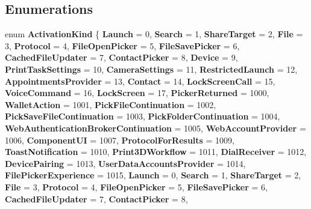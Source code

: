 \subsection*{Enumerations}
\begin{DoxyCompactItemize}
\item 
\mbox{\label{namespace_windows_1_1_application_model_1_1_activation_a21aa80ed65cf8b4f5d0d6c3b39f65284}} 
enum {\bfseries Activation\+Kind} \{ \newline
{\bfseries Launch} = 0, 
{\bfseries Search} = 1, 
{\bfseries Share\+Target} = 2, 
{\bfseries File} = 3, 
\newline
{\bfseries Protocol} = 4, 
{\bfseries File\+Open\+Picker} = 5, 
{\bfseries File\+Save\+Picker} = 6, 
{\bfseries Cached\+File\+Updater} = 7, 
\newline
{\bfseries Contact\+Picker} = 8, 
{\bfseries Device} = 9, 
{\bfseries Print\+Task\+Settings} = 10, 
{\bfseries Camera\+Settings} = 11, 
\newline
{\bfseries Restricted\+Launch} = 12, 
{\bfseries Appointments\+Provider} = 13, 
{\bfseries Contact} = 14, 
{\bfseries Lock\+Screen\+Call} = 15, 
\newline
{\bfseries Voice\+Command} = 16, 
{\bfseries Lock\+Screen} = 17, 
{\bfseries Picker\+Returned} = 1000, 
{\bfseries Wallet\+Action} = 1001, 
\newline
{\bfseries Pick\+File\+Continuation} = 1002, 
{\bfseries Pick\+Save\+File\+Continuation} = 1003, 
{\bfseries Pick\+Folder\+Continuation} = 1004, 
{\bfseries Web\+Authentication\+Broker\+Continuation} = 1005, 
\newline
{\bfseries Web\+Account\+Provider} = 1006, 
{\bfseries Component\+UI} = 1007, 
{\bfseries Protocol\+For\+Results} = 1009, 
{\bfseries Toast\+Notification} = 1010, 
\newline
{\bfseries Print3\+D\+Workflow} = 1011, 
{\bfseries Dial\+Receiver} = 1012, 
{\bfseries Device\+Pairing} = 1013, 
{\bfseries User\+Data\+Accounts\+Provider} = 1014, 
\newline
{\bfseries File\+Picker\+Experience} = 1015, 
{\bfseries Launch} = 0, 
{\bfseries Search} = 1, 
{\bfseries Share\+Target} = 2, 
\newline
{\bfseries File} = 3, 
{\bfseries Protocol} = 4, 
{\bfseries File\+Open\+Picker} = 5, 
{\bfseries File\+Save\+Picker} = 6, 
\newline
{\bfseries Cached\+File\+Updater} = 7, 
{\bfseries Contact\+Picker} = 8, 

\end{DoxyCompactItemize}
